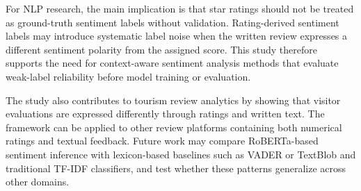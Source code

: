 \documentclass[conference]{IEEEtran}
\begin{document}
For NLP research, the main implication is that star ratings should not be treated as ground-truth sentiment labels without validation. Rating-derived sentiment labels may introduce systematic label noise when the written review expresses a different sentiment polarity from the assigned score. This study therefore supports the need for context-aware sentiment analysis methods that evaluate weak-label reliability before model training or evaluation.

The study also contributes to tourism review analytics by showing that visitor evaluations are expressed differently through ratings and written text. The framework can be applied to other review platforms containing both numerical ratings and textual feedback. Future work may compare RoBERTa-based sentiment inference with lexicon-based baselines such as VADER or TextBlob and traditional TF-IDF classifiers, and test whether these patterns generalize across other domains.

 



\end{document}
